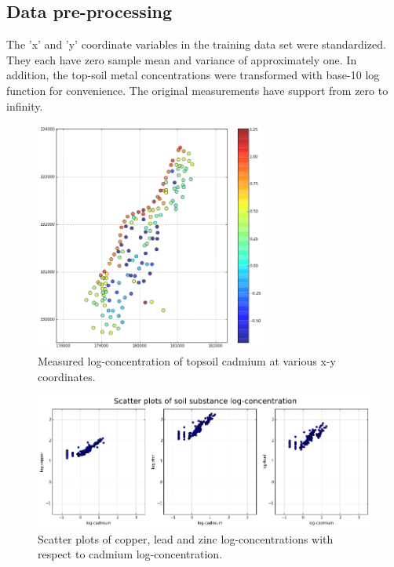 \documentclass{article}
\begin{document}
\subsection{Data pre-processing}
The 'x' and 'y' coordinate variables in the training data set were standardized. 
They each have zero sample mean and variance of approximately one. In addition, the top-soil metal 
concentrations were transformed with base-10 log function for convenience. The original measurements 
have support from zero to infinity.

\begin{figure}[!htbp]
    \centering
    \includegraphics[width=3in]{figures/logcadmium-map.png}
    \caption{Measured log-concentration of topsoil cadmium at various x-y coordinates.}
    \label{logcad-map}
\end{figure}


\begin{figure}[!htbp]
    \centering
    \includegraphics[width=5in]{figures/measurements-scatter.png}
    \caption{Scatter plots of copper, lead and zinc log-concentrations with respect to cadmium log-concentration.}
    \label{measurements-scatter}
\end{figure}

\newpage
\end{document}
